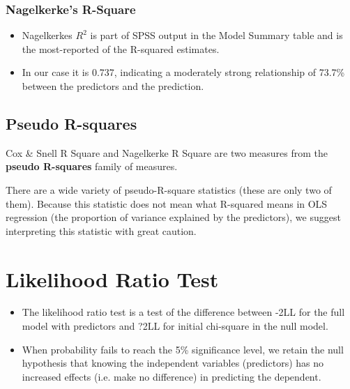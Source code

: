 \documentclass[a4paper,12pt]{article}
\begin{document}
\subsubsection{Nagelkerke's R-Square}
\begin{itemize}
	\item  Nagelkerkes $R^2$ is part of SPSS output in the Model Summary table and is the most-reported of the R-squared estimates. 
	\item In our case it is 0.737, indicating a moderately strong relationship of 73.7\% between the predictors and the prediction.
	
	

\end{itemize}




\subsection{Pseudo R-squares}
Cox \& Snell R Square and Nagelkerke R Square are two measures from the \textbf{pseudo R-squares} family of measures.


There are a wide variety of pseudo-R-square statistics (these are only two of them).  Because this statistic does not mean what R-squared means in OLS regression (the proportion of variance explained by the predictors), we suggest interpreting this statistic with great caution.


\section{Likelihood Ratio Test}
\begin{itemize}
	\item The likelihood ratio test is a test of the difference between -2LL for the full
	model with predictors and ?2LL for initial chi-square in the null model.
	\item When probability fails to reach the 5\% significance level, we retain the null hypothesis
	that knowing the independent variables (predictors) has no increased effects (i.e. make no
	difference) in predicting the dependent.
\end{itemize}
\end{document}
